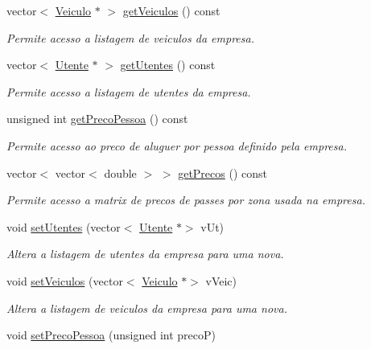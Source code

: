 \begin{DoxyCompactItemize}
vector$<$ \mbox{\hyperlink{class_veiculo}{Veiculo}} $\ast$ $>$ \mbox{\hyperlink{class_empresa_a64b4f5f7e313a07569451b5a82f822bb}{get\+Veiculos}} () const
\begin{DoxyCompactList}\small\item\em Permite acesso a listagem de veiculos da empresa. \end{DoxyCompactList}\item 
vector$<$ \mbox{\hyperlink{class_utente}{Utente}} $\ast$ $>$ \mbox{\hyperlink{class_empresa_a8eded445f1ae7289bb1ba77adb7c581e}{get\+Utentes}} () const
\begin{DoxyCompactList}\small\item\em Permite acesso a listagem de utentes da empresa. \end{DoxyCompactList}\item 
unsigned int \mbox{\hyperlink{class_empresa_a0c2b8d30106124c1eb34e82769337656}{get\+Preco\+Pessoa}} () const
\begin{DoxyCompactList}\small\item\em Permite acesso ao preco de aluguer por pessoa definido pela empresa. \end{DoxyCompactList}\item 
vector$<$ vector$<$ double $>$ $>$ \mbox{\hyperlink{class_empresa_a1b5f74cd32b847b36d39bba103e34f24}{get\+Precos}} () const
\begin{DoxyCompactList}\small\item\em Permite acesso a matrix de precos de passes por zona usada na empresa. \end{DoxyCompactList}\item 
void \mbox{\hyperlink{class_empresa_a0733c7676b94e4e273b3e9b5f7d1c5ad}{set\+Utentes}} (vector$<$ \mbox{\hyperlink{class_utente}{Utente}} $\ast$$>$ v\+Ut)
\begin{DoxyCompactList}\small\item\em Altera a listagem de utentes da empresa para uma nova. \end{DoxyCompactList}\item 
void \mbox{\hyperlink{class_empresa_a6e492b399a9e3362ed1b50fb05bb36b5}{set\+Veiculos}} (vector$<$ \mbox{\hyperlink{class_veiculo}{Veiculo}} $\ast$$>$ v\+Veic)
\begin{DoxyCompactList}\small\item\em Altera a listagem de veiculos da empresa para uma nova. \end{DoxyCompactList}\item 
void \mbox{\hyperlink{class_empresa_aa2ecc54f025070f55e013dd439c22936}{set\+Preco\+Pessoa}} (unsigned int precoP)

\end{DoxyCompactItemize}
